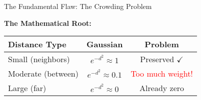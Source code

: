 \documentclass[10pt]{beamer}
\begin{document}
\begin{frame}{The Fundamental Flaw: The Crowding Problem}
\begin{figure}
\end{figure}

\vspace{0.05cm}
\textbf{The Mathematical Root:}
\vspace{-0.1cm}
\begin{center}
\footnotesize
\renewcommand{\arraystretch}{0.9}
\begin{tabular}{lcc}
\hline
\textbf{Distance Type} & \textbf{Gaussian} & \textbf{Problem} \\
\hline
Small (neighbors) & $e^{-d^2} \approx 1$ & Preserved $\checkmark$ \\
Moderate (between) & $e^{-d^2} \approx 0.1$ & \textcolor{red}{Too much weight!} \\
Large (far) & $e^{-d^2} \approx 0$ & Already zero \\
\hline
\end{tabular}
\end{center}

\end{frame}
\end{document}
